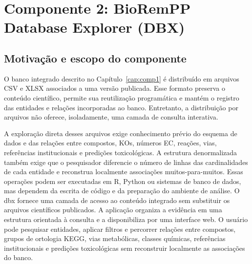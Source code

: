 \chapter{Componente 2: BioRemPP Database Explorer (DBX)}
\label{cap:comp2}

\section{Motivação e escopo do componente}
\label{sec:c2-motivacao}

O banco integrado descrito no Capítulo~\ref{cap:comp1} é distribuído em
arquivos CSV e XLSX associados a uma versão publicada. Esse formato preserva
o conteúdo científico, permite sua reutilização programática e mantém o
registro das entidades e relações incorporadas ao banco. Entretanto, a
distribuição por arquivos não oferece, isoladamente, uma camada de consulta
interativa.

A exploração direta desses arquivos exige conhecimento prévio do esquema de
dados e das relações entre compostos, KOs, números EC, reações, vias,
referências institucionais e predições toxicológicas. A estrutura
denormalizada também exige que o pesquisador diferencie o número de linhas das
cardinalidades de cada entidade e reconstrua localmente associações
muitos-para-muitos. Essas operações podem ser executadas em R, Python ou
sistemas de banco de dados, mas dependem da escrita de código e da preparação
do ambiente de análise. O \gls{dbx} fornece uma camada de acesso ao conteúdo integrado sem substituir
os arquivos científicos publicados. A aplicação organiza a evidência em uma
estrutura orientada à consulta e a disponibiliza por uma interface web. O
usuário pode pesquisar entidades, aplicar filtros e percorrer relações entre
compostos, grupos de ortologia KEGG, vias metabólicas, classes químicas,
referências institucionais e predições toxicológicas sem reconstruir
localmente as associações do banco.

